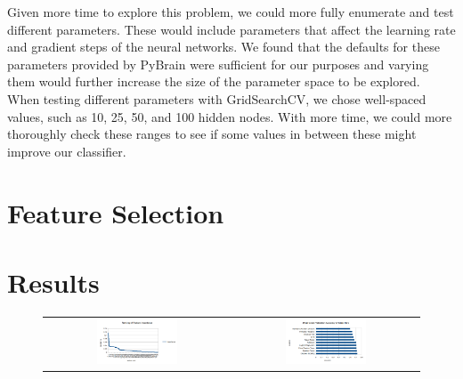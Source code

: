 \documentclass{article}
\begin{document}
Given more time to explore this problem, we could more fully enumerate and test different parameters.
These would include parameters that affect the learning rate and gradient steps of the neural networks.
We found that the defaults for these parameters provided by PyBrain were sufficient for our purposes and varying them would further increase the size of the parameter space to be explored.
When testing different parameters with GridSearchCV, we chose well-spaced values, such as 10, 25, 50, and 100 hidden nodes.
With more time, we could more thoroughly check these ranges to see if some values in between these might improve our classifier.



\section{Feature Selection}



\section{Results}
\label{results}

\begin{figure}[!h]
\centering
\begin{tabular}{cc}
\includegraphics[width=0.45\textwidth]{feature_importance} &
\includegraphics[width=0.45\textwidth]{crossval}
\end{tabular}
\end{figure}
\end{document}
